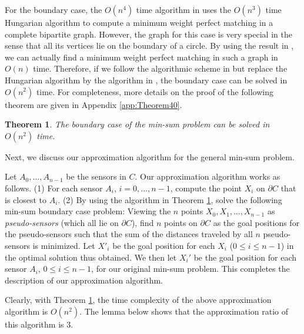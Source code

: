 \documentclass[11pt]{article}
\newtheorem{Theo}{Theorem}
\begin{document}
For the boundary case, the $O(n^4)$ time algorithm in
\cite{ref:TanNe10} uses the $O(n^3)$ time Hungarian algorithm
to compute a minimum weight perfect matching in a complete bipartite graph.
However, the graph for this case is very special in the sense that all its
vertices lie on the boundary of a circle. By using the result in \cite{ref:BussLi98},
we can actually find a minimum weight perfect matching in such a graph
in $O(n)$ time. Therefore, if we follow the algorithmic scheme in
\cite{ref:TanNe10} but replace the Hungarian algorithm by the algorithm in
\cite{ref:BussLi98}, the boundary case can be solved in
$O(n^2)$ time. For completeness, more details on the proof of the
following theorem are given in Appendix \ref{app:Theorem40}.

\begin{Theo}\label{theo:40}
The boundary case of the min-sum problem can be solved in $O(n^2)$
time.
\end{Theo}

Next, we discuss our approximation algorithm for the general min-sum
problem.

Let $A_0,\ldots,A_{n-1}$ be the sensors in $C$. Our approximation
algorithm works as follows. (1) For each sensor $A_i$,
$i=0,\ldots,n-1$, compute the point $X_i$ on $\partial C$ that is
closest to $A_i$. (2) By using the algorithm in Theorem \ref{theo:40},
solve the following min-sum boundary case problem: Viewing the $n$
points $X_0,X_1,\ldots,X_{n-1}$ as {\em pseudo-sensors} (which all
lie on $\partial C$), find $n$ points on $\partial C$ as the goal
positions for the pseudo-sensors such that the sum of the distances
traveled by all $n$ pseudo-sensors is minimized. Let $X'_i$ be the goal
position for each $X_i$ ($0\leq i \leq n - 1$) in the optimal
solution thus obtained. We then let $X_i'$ be the goal position for each sensor
$A_i$, $0\leq i\leq n-1$, for our original min-sum problem. This completes the
description of our approximation algorithm.

Clearly, with Theorem \ref{theo:40}, the time complexity of the
above approximation algorithm is $O(n^2)$. The lemma below shows that the
approximation ratio of this algorithm is $3$.
\end{document}
